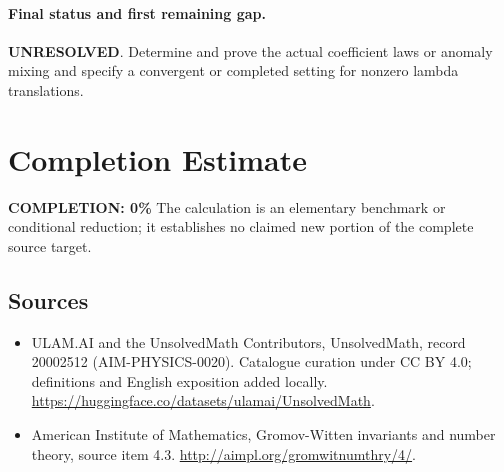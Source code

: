 \documentclass[11pt]{article}
\begin{document}
\paragraph{Final status and first remaining gap.}
\textbf{UNRESOLVED}. Determine and prove the actual coefficient laws or anomaly mixing and specify a convergent or completed setting for nonzero lambda translations.

\section{Completion Estimate}
\noindent\textbf{COMPLETION: 0\%}
The calculation is an elementary benchmark or conditional reduction; it establishes no claimed new portion of the complete source target.

\subsection{Sources}
\begin{itemize}
\item[\hypertarget{source:20002512:1}{S1}] ULAM.AI and the UnsolvedMath Contributors, UnsolvedMath, record 20002512 (AIM-PHYSICS-0020). Catalogue curation under CC BY 4.0; definitions and English exposition added locally.
\url{https://huggingface.co/datasets/ulamai/UnsolvedMath}.
\item[\hypertarget{source:20002512:2}{S2}] American Institute of Mathematics, Gromov-Witten invariants and number theory, source item 4.3.
\url{http://aimpl.org/gromwitnumthry/4/}.
\end{itemize}
\label{end:20002512}
\end{document}
